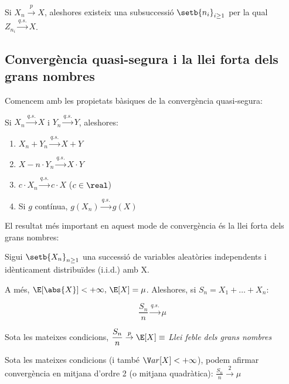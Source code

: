 \begin{prop}
  Si $X_n \overset{p}{\to} X$, aleshores existeix una subsuccessió $\setb{n_i}_{i\geq 1}$ per la qual $Z_{n_i}\overset{q.s.}{\longrightarrow} X$.
\end{prop}

\newpage

\subsection{Convergència quasi-segura i la llei forta dels grans nombres}

Comencem amb les propietats bàsiques de la convergència quasi-segura:

\begin{prop}
  Si $X_n \overset{q.s.}{\to} X$ i $Y_n \overset{q.s.}{\to} Y$, aleshores:
  \begin{enumerate}[label=\alph*)]
    \item $X_n + Y_n \overset{q.s.}{\longrightarrow} X+Y$
    \item $X-n \cdot Y_n \overset{q.s.}{\longrightarrow} X \cdot Y$
    \item $c \cdot X_n \overset{q.s.}{\longrightarrow} c \cdot X$ ($c\in \real$)
    \item Si $g$ contínua, $g(X_n) \overset{q.s.}{\longrightarrow} g(X)$
  \end{enumerate}
\end{prop}

El resultat més important en aquest mode de convergència és la llei forta dels grans nombres:

\begin{thm}
  Sigui $\setb{X_n}_{n\geq 1}$ una successió de variables aleatòries independents i idènticament distribuïdes (i.i.d.) amb X.
  
  A més, $\E[\abs{X}]<+\infty, \, \E[X] = \mu$. Aleshores, si $S_n = X_1 + \ldots + X_n$:
  
  \[
    \frac{S_n}{n} \overset{q.s.}{\longrightarrow}\mu 
  \]
\end{thm}

\begin{obs}
  Sota les mateixes condicions, $\dfrac{S_n}{n}\overset{p}{\to}\E[X] \equiv$ \textit{Llei feble dels grans nombres}
\end{obs}

\begin{obs}
  Sota les mateixes condicions (i també $\V ar[X]< +\infty$), podem afirmar convergència en 
  mitjana d'ordre 2 (o mitjana quadràtica): $\frac{S_n}{n} \overset{2}{\to}\mu$
\end{obs}

